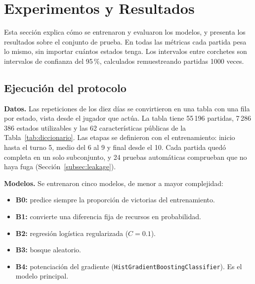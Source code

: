 
\section{Experimentos y Resultados}
\label{sec:resultados}

Esta sección explica cómo se entrenaron y evaluaron los modelos, y presenta
los resultados sobre el conjunto de prueba. En todas las métricas cada
partida pesa lo mismo, sin importar cuántos estados tenga. Los intervalos
entre corchetes son intervalos de confianza del 95\,\%, calculados
remuestreando partidas 1000 veces.

\subsection{Ejecución del protocolo}
\label{subsec:ejecucion}

\noindent\textbf{Datos.} Las repeticiones de los diez días se convirtieron
en una tabla con una fila por estado, vista desde el jugador que actúa. La
tabla tiene 55\,196 partidas, 7\,286\,386 estados utilizables y las 62
características públicas de la Tabla~\ref{tab:diccionario}. Las etapas se
definieron con el entrenamiento: inicio hasta el turno 5, medio del 6 al 9
y final desde el 10. Cada partida quedó completa en un solo subconjunto, y
24 pruebas automáticas comprueban que no haya fuga
(Sección~\ref{subsec:leakage}).

\noindent\textbf{Modelos.} Se entrenaron cinco modelos, de menor a mayor
complejidad:
\begin{itemize}
  \item \textbf{B0:} predice siempre la proporción de victorias del
        entrenamiento.
  \item \textbf{B1:} convierte una diferencia fija de recursos en
        probabilidad.
  \item \textbf{B2:} regresión logística regularizada ($C = 0.1$).
  \item \textbf{B3:} bosque aleatorio.
  \item \textbf{B4:} potenciación del gradiente
        (\texttt{HistGradientBoostingClassifier}). Es el modelo principal.
\end{itemize}


